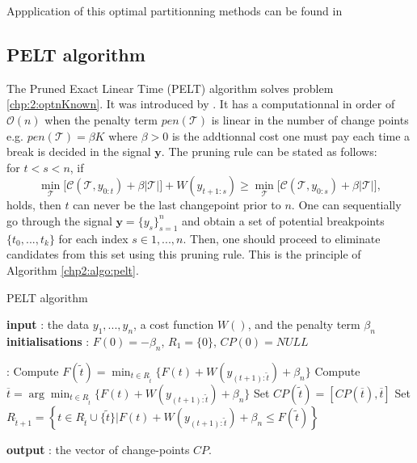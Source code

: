 Appplication of this optimal partitionning methods can be found in \cite{rigaill2015pruned,Lavielle1997,perron2006dealing}

\subsection{PELT algorithm}\label{chp2:pelt}

The Pruned Exact Linear Time (PELT) algorithm solves problem \ref{chp:2:optnKnown}. It was introduced by \cite{Killick2012}. It has a computationnal in order of $\mathcal{O}(n)$ when the penalty term $pen(\mathcal{T})$ is linear in the number of change points e.g. $pen(\mathcal{T}) = \beta K$ where $\beta > 0$ is the addtionnal cost one must pay each time a break is decided in the signal $\bm y$. The pruning rule can be stated as follows: \\
for $t<s < n$, if
\begin{equation}\label{chp2:pruning}
 \min_{\mathcal{T}}\bigg[\mathcal{C}(\mathcal{T},y_{0:t})+\beta\lvert \mathcal{T}\rvert\bigg] + W(y_{t+1:s}) \geq \min_{\mathcal{T}}\bigg[\mathcal{C}(\mathcal{T},y_{0:s})+\beta\lvert \mathcal{T}\rvert\bigg], 
\end{equation}
holds, then $t$ can never be the last changepoint prior to $n$.   
One can sequentially go through the signal $\bm y = \{y_s\}_{s=1}^n$ and obtain a set of potential breakpoints $\{t_0,...,t_k\}$ for each index $s \in {1,...,n}$. Then, one should proceed to eliminate candidates from this set using this pruning rule. This is the principle of Algorithm \ref{chp2:algo:pelt}.

\begin{algorithm}[ht]
\caption{PELT algorithm}\label{chp2:algo:pelt}
\begin{algorithmic}

\State \textbf{input} : the data $y_{1},...,y_{n}$, a cost function $W()$, and the penalty term $\beta_{n}$ \\
  
\State \textbf{initialisations} : $F(0)=-\beta_{n}$, $R_{1}=\lbrace 0\rbrace$, $CP(0)=NULL$  
  
 :
  \State Compute 
  $ F(\tilde t)=\min_{t\in R_{\tilde t}}\lbrace F(t)+W(y_{(t+1):\tilde t})+\beta_{n}\rbrace $
  \State Compute $ \overline t=\arg \min_{t\in R_{\tilde t}}\lbrace F(t)+W(y_{(t+1):\tilde t})+\beta_{n}\rbrace $ 
  \State Set $CP(\tilde t)=[CP(\overline t), \overline t]$
  \State Set $R_{\tilde t+1}=\left\{t\in R_{\tilde t}\cup \lbrace\tilde t\rbrace \vert F(t)+W(y_{(t+1):\tilde t}) +\beta_{n} \le F(\tilde t)   \right\}$ 
\EndFor 
   
\State \textbf{output} : the vector of change-points $CP$. 
 
\end{algorithmic}
\end{algorithm} 

